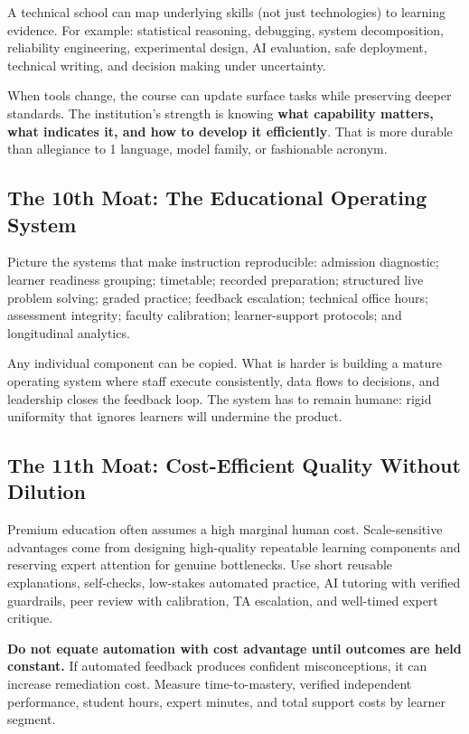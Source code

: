A technical school can map underlying skills (not just technologies) to learning evidence. For example: statistical reasoning, debugging, system decomposition, reliability engineering, experimental design, AI evaluation, safe deployment, technical writing, and decision making under uncertainty.

When tools change, the course can update surface tasks while preserving deeper standards. The institution's strength is knowing \textbf{what capability matters, what indicates it, and how to develop it efficiently}. That is more durable than allegiance to 1 language, model family, or fashionable acronym.

\subsection{The 10th Moat: The Educational Operating System}
\label{sec:tenth_moat_educational_operating_system}

Picture the systems that make instruction reproducible: admission diagnostic; learner readiness grouping; timetable; recorded preparation; structured live problem solving; graded practice; feedback escalation; technical office hours; assessment integrity; faculty calibration; learner-support protocols; and longitudinal analytics.

Any individual component can be copied. What is harder is building a mature operating system where staff execute consistently, data flows to decisions, and leadership closes the feedback loop. The system has to remain humane: rigid uniformity that ignores learners will undermine the product.

\subsection{The 11th Moat: Cost-Efficient Quality Without Dilution}
\label{sec:eleventh_moat_cost_efficient_quality}

Premium education often assumes a high marginal human cost. Scale-sensitive advantages come from designing high-quality repeatable learning components and reserving expert attention for genuine bottlenecks. Use short reusable explanations, self-checks, low-stakes automated practice, AI tutoring with verified guardrails, peer review with calibration, TA escalation, and well-timed expert critique.

\textbf{Do not equate automation with cost advantage until outcomes are held constant.} If automated feedback produces confident misconceptions, it can increase remediation cost. Measure time-to-mastery, verified independent performance, student hours, expert minutes, and total support costs by learner segment.


